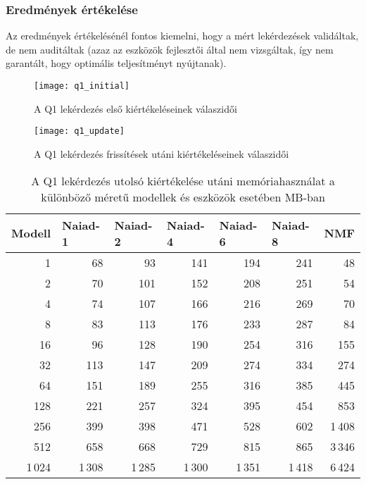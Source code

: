 \subsubsection{Eredmények értékelése}

Az eredmények értékelésénél fontos kiemelni, hogy a mért lekérdezések validáltak, de nem auditáltak (azaz az eszközök fejlesztői által nem vizsgáltak, így nem garantált, hogy optimális teljesítményt nyújtanak).

\begin{figure}[ht!]
	\centering
	\texttt{[image: q1\_initial]}
	\caption{A Q1 lekérdezés első kiértékeléseinek válaszidői}
	\label{fig:q1_initial}
\end{figure}
\begin{figure}[ht!]
	\centering
	\texttt{[image: q1\_update]}
	\caption{A Q1 lekérdezés frissítések utáni kiértékeléseinek válaszidői}
	\label{fig:q1_update}
\end{figure}

\begin{table}[ht!]
	\centering
	\begin{tabular}{rrrrrrr}
		\toprule
		\multicolumn{1}{l}{Modell} & \multicolumn{1}{l}{Naiad-1} & \multicolumn{1}{l}{Naiad-2}& \multicolumn{1}{l}{Naiad-4} & \multicolumn{1}{l}{Naiad-6} & \multicolumn{1}{l}{Naiad-8}& \multicolumn{1}{l}{NMF} \\
		\midrule
		1 & 68 & 93 & 141 & 194 & 241 & 48 \\
		2 & 70 & 101 & 152 & 208 & 251 & 54 \\
		4 & 74 & 107 & 166 & 216 & 269 & 70 \\
		8 & 83 & 113 & 176 & 233 & 287 & 84 \\
		16 & 96 & 128 & 190 & 254 & 316 & 155 \\
		32 & 113 & 147 & 209 & 274 & 334 & 274 \\
		64 & 151 & 189 & 255 & 316 & 385 & 445 \\
		128 & 221 & 257 & 324 & 395 & 454 & 853 \\
		256 & 399 & 398 & 471 & 528 & 602 & 1\,408 \\
		512 & 658 & 668 & 729 & 815 & 865 & 3\,346 \\
		1\,024 & 1\,308 & 1\,285 & 1\,300 & 1\,351 & 1\,418 & 6\,424 \\
		\bottomrule
	\end{tabular}
	\caption{A Q1 lekérdezés utolsó kiértékelése utáni memóriahasználat a különböző méretű modellek és eszközök esetében MB-ban}
	\label{tab:q1-memory}
\end{table}

